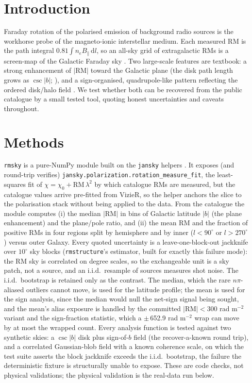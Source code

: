 \documentclass[twocolumn]{aastex631}
\newcommand{\code}[1]{\texttt{#1}}
\begin{document}
\section{Introduction}
Faraday rotation of the polarised emission of background radio sources is the workhorse probe of the
magneto-ionic interstellar medium. Each measured RM is the path integral
$0.81\int n_e B_\parallel\,\mathrm{d}l$, so an all-sky grid of extragalactic RMs is a screen-map of the
Galactic Faraday sky \citep{taylor2009,oppermann2012}. Two large-scale features are textbook: a strong
enhancement of $|\mathrm{RM}|$ toward the Galactic plane (the disk path length grows as $\csc|b|$;
\citealt{schnitzeler2010}), and a sign-organised, quadrupole-like pattern reflecting the ordered
disk/halo field \citep{taylor2009,sun2008}. We test whether both can be recovered from the public
catalogue by a small tested tool, quoting honest uncertainties and caveats throughout.

\section{Methods}
\code{rmsky} is a pure-NumPy module built on the \code{jansky} helpers \citep{jansky}. It exposes
(and round-trip verifies) \code{jansky.polarization.rotation\_measure\_fit}, the least-squares fit
of $\chi=\chi_0+\mathrm{RM}\,\lambda^2$ by which catalogue RMs are measured, but the catalogue values arrive pre-fitted from VizieR, so the helper anchors the slice to the polarisation stack
without being applied to the data. From the catalogue the module computes (i) the median
$|\mathrm{RM}|$ in bins of Galactic latitude $|b|$ (the plane enhancement) and the plane/pole
ratio, and (ii) the mean RM and the fraction of positive RMs in four regions split by hemisphere
and by inner ($l<90^\circ$ or $l>270^\circ$) versus outer Galaxy. Every quoted uncertainty is a
leave-one-block-out jackknife over $10^\circ$ sky blocks (\code{rmstructure}'s estimator, built
for exactly this failure mode): the RM sky is correlated on degree scales, so the exchangeable
unit is a sky patch, not a source, and an i.i.d.\ resample of sources measures shot noise. The
i.i.d.\ bootstrap is retained only as the contrast. The median, which the rare
$n\pi$-aliased outliers cannot move, is used for the latitude profile; the mean is used for the sign
analysis, since the median would null the net-sign signal being sought, and the mean's alias
exposure is handled by the committed $|\mathrm{RM}|<300$ rad m$^{-2}$ variant and the
sign-fraction statistic, which a $\pm$\,652.9 rad m$^{-2}$ wrap can move by at most the wrapped
count. Every analysis function is tested against two synthetic skies: a $\csc|b|$ disk plus
sign-of-$b$ field (the recover-a-known round trip), and a correlated Gaussian-blob field with a
known coherence scale, on which the test suite asserts the block jackknife exceeds the i.i.d.\ bootstrap, the failure the deterministic fixture is structurally unable to expose. These are
code checks, not physical validations; the physical validation is the real-data run below.
\end{document}
